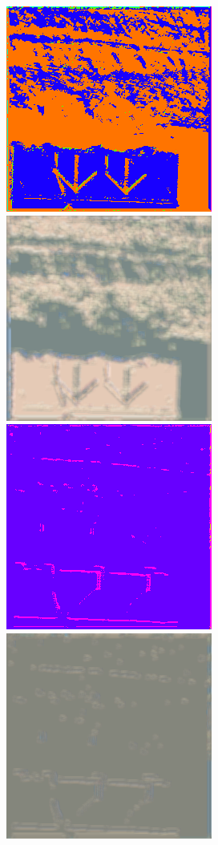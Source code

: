 \begin{figure}
    \includegraphics[width=\WnetPredictionsImageWidth]{images/wnet/46d-6/102574-prediction} \hfill
    \includegraphics[width=\WnetPredictionsImageWidth]{images/wnet/46d-6/102574-restored} \hfill
    \includegraphics[width=\WnetPredictionsImageWidth]{images/wnet/36d-20/102574-prediction} \hfill
    \includegraphics[width=\WnetPredictionsImageWidth]{images/wnet/36d-20/102574-restored} \hfill

\end{figure}

